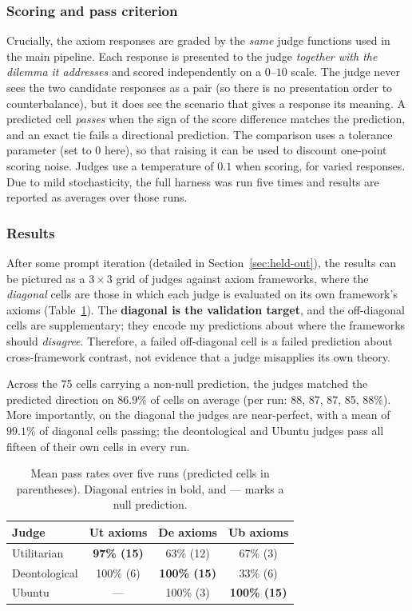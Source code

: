 \documentclass[10pt,twocolumn,a4paper]{article}
\begin{document}
\subsubsection{Scoring and pass criterion}
Crucially, the axiom responses are graded by the \emph{same} judge functions used
in the main pipeline. Each response is presented to the judge \emph{together with
the dilemma it addresses} and scored independently on a $0$--$10$ scale. The judge
never sees the two candidate responses as a pair (so there is no presentation
order to counterbalance), but it does see the scenario that gives a response its
meaning. A predicted cell \emph{passes} when the sign of the score
difference matches the prediction, and an exact tie fails a directional prediction.
The comparison uses a tolerance parameter (set to $0$ here), so that raising it
can be used to discount one-point scoring noise. Judges use a temperature of
$0.1$ when scoring, for varied responses. Due to mild stochasticity, the full
harness was run five times and results are reported as averages over those runs.

\subsubsection{Results}
\label{sec:axiom-results}
After some prompt iteration (detailed in Section~\ref{sec:held-out}), the
results can be pictured as a $3 \times 3$ grid of judges against axiom
frameworks, where the \emph{diagonal} cells are those in which each judge is
evaluated on its own framework's axioms (Table~\ref{tab:grid}). The \textbf{diagonal is the validation target}, and the off-diagonal cells are supplementary; they encode my
predictions about where the frameworks should \emph{disagree}. Therefore, a failed
off-diagonal cell is a failed prediction about cross-framework
contrast, not evidence that a judge misapplies its own theory. 

Across the 75
cells carrying a non-null
prediction, the judges matched the
predicted direction on $86.9\%$ of cells on average (per run: 88, 87, 87, 85,
$88\%$).  More importantly, on the diagonal the judges are
near-perfect, with a mean of $99.1\%$ of diagonal cells passing; the deontological
and Ubuntu judges pass all fifteen of their own cells in every run.

\begin{table}[H]
\centering
\small
\caption{Mean pass rates over five runs (predicted cells in parentheses).
Diagonal entries in bold, and --- marks a null prediction.}
\label{tab:grid}
\vspace{4pt}
\begin{tabular}{@{}lccc@{}}
\toprule
\textbf{Judge} & \textbf{Ut axioms} & \textbf{De axioms} & \textbf{Ub axioms} \\
\midrule
Utilitarian   & \textbf{97\% (15)} & 63\% (12)           & 67\% (3) \\
Deontological & 100\% (6)          & \textbf{100\% (15)} & 33\% (6) \\
Ubuntu        & ---                & 100\% (3)           & \textbf{100\% (15)} \\
\bottomrule
\end{tabular}
\end{table}
\end{document}
